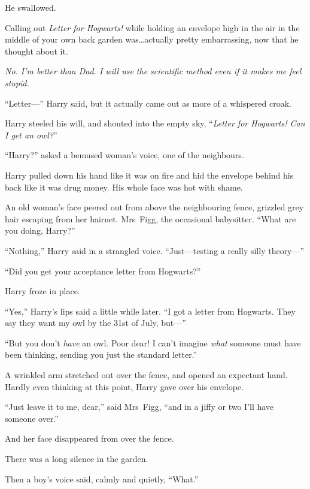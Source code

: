 He swallowed.

Calling out \emph{Letter for Hogwarts!} while holding an envelope high in the air in the middle of your own back garden was…actually pretty embarrassing, now that he thought about it.

\emph{No. I’m better than Dad. I will use the scientific method even if it makes me feel stupid.}

“Letter—” Harry said, but it actually came out as more of a whispered croak.

Harry steeled his will, and shouted into the empty sky, “\emph{Letter for Hogwarts! Can I get an owl?}”

“Harry?” asked a bemused woman’s voice, one of the neighbours.

Harry pulled down his hand like it was on fire and hid the envelope behind his back like it was drug money. His whole face was hot with shame.

An old woman’s face peered out from above the neighbouring fence, grizzled grey hair escaping from her hairnet. Mrs~Figg, the occasional babysitter. “What are you doing, Harry?”

“Nothing,” Harry said in a strangled voice. “Just—testing a really silly theory—”

“Did you get your acceptance letter from Hogwarts?”

Harry froze in place.

“Yes,” Harry’s lips said a little while later. “I got a letter from Hogwarts. They say they want my owl by the 31st of July, but—”

“But you don’t \emph{have} an owl. Poor dear! I can’t imagine \emph{what} someone must have been thinking, sending you just the standard letter.”

A wrinkled arm stretched out over the fence, and opened an expectant hand. Hardly even thinking at this point, Harry gave over his envelope.

“Just leave it to me, dear,” said Mrs~Figg, “and in a jiffy or two I’ll have someone over.”

And her face disappeared from over the fence.

There was a long silence in the garden.

Then a boy’s voice said, calmly and quietly, “What.”


